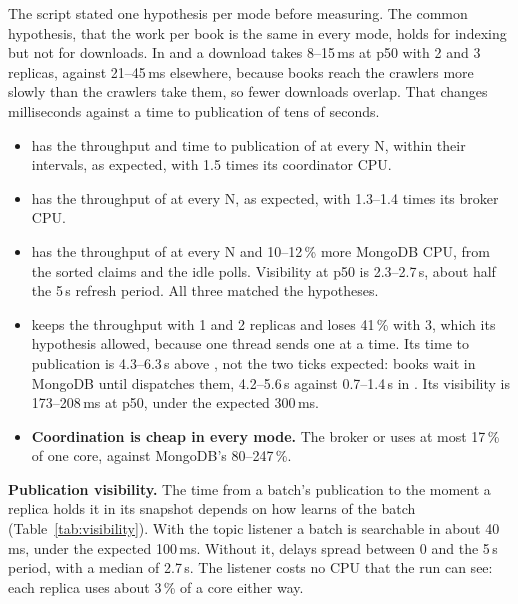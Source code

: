 The script stated one hypothesis per mode before measuring. The common hypothesis, that the work per book is the same
in every mode, holds for indexing but not for downloads. In  and  a
download takes 8--15\,ms at p50 with 2 and 3 replicas, against 21--45\,ms elsewhere, because books reach the crawlers
more slowly than the crawlers take them, so fewer downloads overlap. That changes milliseconds against a time to
publication of tens of seconds.

\begin{itemize}
\item \textbf{} has the throughput and time to publication of  at every N, within
  their intervals, as expected, with 1.5 times its coordinator CPU.
\item \textbf{} has the throughput of  at every N, as expected, with 1.3--1.4
  times its broker CPU.
\item \textbf{} has the throughput of  at every N and 10--12\,\% more MongoDB CPU, from
  the sorted claims and the idle polls. Visibility at p50 is 2.3--2.7\,s, about half the 5\,s refresh period. All three
  matched the hypotheses.
\item \textbf{} keeps the throughput with 1 and 2 replicas and loses 41\,\% with 3, which its
  hypothesis allowed, because one thread sends one  at a time. Its time to publication is 4.3--6.3\,s above
  , not the two ticks expected: books wait in MongoDB until  dispatches them, 4.2--5.6\,s
  against 0.7--1.4\,s in . Its visibility is 173--208\,ms at p50, under the expected 300\,ms.
\item \textbf{Coordination is cheap in every mode.} The broker or  uses at most 17\,\% of one core,
  against MongoDB's 80--247\,\%.
\end{itemize}

\textbf{Publication visibility.} The time from a batch's publication to the moment a  replica holds it
in its snapshot depends on how  learns of the batch (Table~\ref{tab:visibility}). With the topic listener
a batch is searchable in about 40\,ms, under the expected 100\,ms. Without it, delays spread between 0 and the 5\,s
period, with a median of 2.7\,s. The listener costs no CPU that the run can see: each  replica uses about
3\,\% of a core either way.

